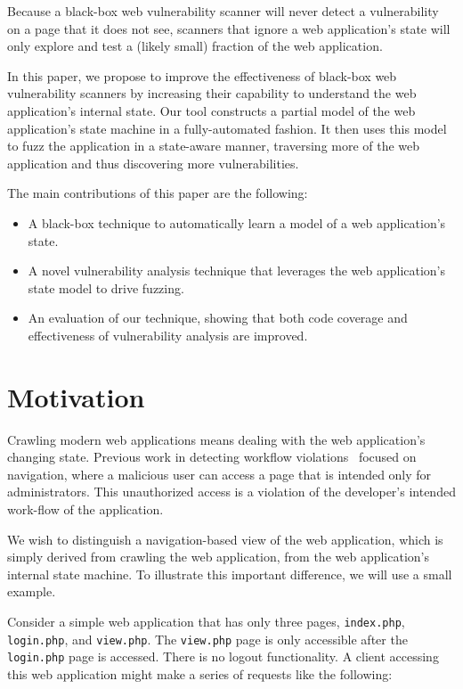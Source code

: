 Because a black-box web vulnerability scanner will never detect a vulnerability
on a page that it does not see, scanners that ignore a web application's state
will only explore and test a (likely small) fraction of the web application.

In this paper, we propose to improve the effectiveness of black-box web vulnerability scanners by
increasing their capability to understand the web application's internal state.
Our tool constructs a partial model of the web application's state machine in a
fully-automated fashion. It then uses this model to fuzz the application in a
state-aware manner, traversing more of the web application and thus discovering
more vulnerabilities.

\noindent{}The main contributions of this paper are the following:
\begin{itemize}
 \item A black-box technique to automatically learn a model of a web
   application's state. 
 \item A novel vulnerability analysis technique that leverages the web
   application's state model to drive fuzzing.
 \item An evaluation of our technique, showing that both code coverage and
   effectiveness of vulnerability analysis are improved.
\end{itemize}

\section{Motivation}



Crawling modern web applications means dealing with the web application's
changing state. Previous work in detecting workflow
violations~\cite{balzarotti07:mimosa,li11:BLOCK,cova07:swaddler,felmetsger10:logic}
focused on navigation, where a malicious user can access a page that is
intended only for administrators. This unauthorized access is a violation of
the developer's intended work-flow of the application.

We wish to distinguish a navigation-based view of the web application, which is
simply derived from crawling the web application, from the web application's
internal state machine. To illustrate this important difference, we will use a small
example.

Consider a simple web application that has only three pages,
\texttt{index.php}, \texttt{login.php}, and \texttt{view.php}. The
\texttt{view.php} page is only accessible after the \texttt{login.php} page is
accessed. There is no logout functionality. A client accessing this web
application might make a series of requests like the following:

